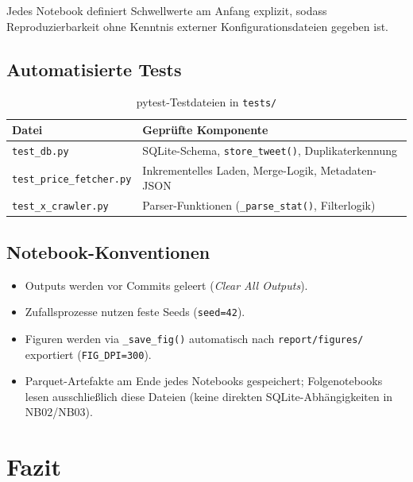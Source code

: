 \documentclass[11pt, a4paper]{article}
\begin{document}
Jedes Notebook definiert Schwellwerte am Anfang explizit, sodass
Reproduzierbarkeit ohne Kenntnis externer Konfigurationsdateien gegeben ist.

\subsection{Automatisierte Tests}

\begin{table}[H]
\centering
\caption{pytest-Testdateien in \texttt{tests/}}
\begin{tabular}{ll}
\toprule
\textbf{Datei} & \textbf{Geprüfte Komponente} \\
\midrule
\texttt{test\_db.py}             &
  SQLite-Schema, \texttt{store\_tweet()}, Duplikaterkennung \\
\texttt{test\_price\_fetcher.py} &
  Inkrementelles Laden, Merge-Logik, Metadaten-JSON \\
\texttt{test\_x\_crawler.py}     &
  Parser-Funktionen (\texttt{\_parse\_stat()}, Filterlogik) \\
\bottomrule
\end{tabular}
\end{table}

\subsection{Notebook-Konventionen}

\begin{itemize}[noitemsep]
  \item Outputs werden vor Commits geleert (\emph{Clear All Outputs}).
  \item Zufallsprozesse nutzen feste Seeds (\texttt{seed=42}).
  \item Figuren werden via \texttt{\_save\_fig()} automatisch nach
        \texttt{report/figures/} exportiert (\texttt{FIG\_DPI=300}).
  \item Parquet-Artefakte am Ende jedes Notebooks gespeichert;
        Folgenotebooks lesen ausschließlich diese Dateien
        (keine direkten SQLite-Abhängigkeiten in NB02/NB03).
\end{itemize}

\section{Fazit}
\label{sec:fazit}
\end{document}
